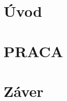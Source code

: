 \documentclass[12pt, oneside]{book}
\begin{document}





\mainmatter

\chapter*{Úvod}



\chapter{PRACA}


\chapter*{Záver}





\newpage	

\backmatter

\thispagestyle{empty}
\nocite{*}
\clearpage


% 

\begin{thebibliography}{5}
 






\end{thebibliography}
\end{document}
